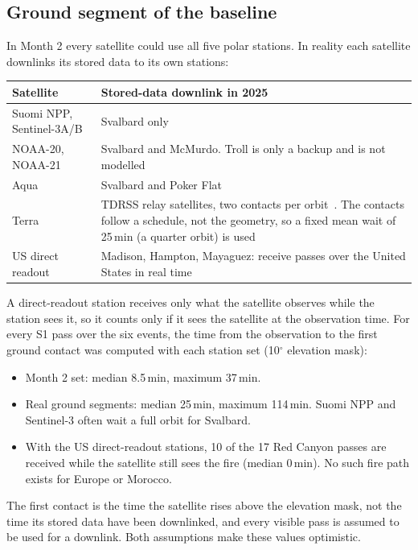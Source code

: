 \documentclass[11pt]{article}
\begin{document}
\subsection{Ground segment of the baseline}

In Month 2 every satellite could use all five polar stations. In reality each satellite downlinks its stored data to its own stations:

\begin{longtable}{|p{4.8cm}|p{10.0cm}|}
\hline
\rowcolor{tablehead}
\textbf{Satellite} & \textbf{Stored-data downlink in 2025} \\
\hline
\endhead
Suomi NPP, Sentinel-3A/B & Svalbard only~\cite{esa2026s3dataflow} \\
\hline
NOAA-20, NOAA-21 & Svalbard and McMurdo. Troll is only a backup and is not modelled \\
\hline
Aqua & Svalbard and Poker Flat~\cite{nasa2002aquaidd} \\
\hline
Terra & TDRSS relay satellites, two contacts per orbit~\cite{nasa2010lance}. The contacts follow a schedule, not the geometry, so a fixed mean wait of 25\,min (a quarter orbit) is used \\
\hline
US direct readout & Madison, Hampton, Mayaguez: receive passes over the United States in real time \\
\hline
\end{longtable}

A direct-readout station receives only what the satellite observes while the station sees it, so it counts only if it sees the satellite at the observation time. For every S1 pass over the six events, the time from the observation to the first ground contact was computed with each station set (10$^\circ$ elevation mask):
\begin{itemize}[leftmargin=1.2cm]
    \item Month 2 set: median 8.5\,min, maximum 37\,min.
    \item Real ground segments: median 25\,min, maximum 114\,min. Suomi NPP and Sentinel-3 often wait a full orbit for Svalbard.
    \item With the US direct-readout stations, 10 of the 17 Red Canyon passes are received while the satellite still sees the fire (median 0\,min). No such fire path exists for Europe or Morocco.
\end{itemize}

The first contact is the time the satellite rises above the elevation mask, not the time its stored data have been downlinked, and every visible pass is assumed to be used for a downlink. Both assumptions make these values optimistic.
\end{document}
